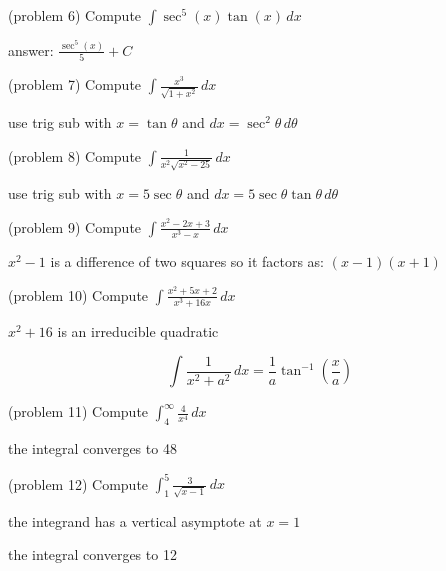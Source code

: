 \documentclass[handout]{ximera}
\begin{document}
\begin{problem}(problem 6)
Compute $\displaystyle \int \sec^5(x) \tan(x)  \, dx$

\begin{hint}
answer: $\displaystyle \frac{\sec^5(x)}{5} + C$
\end{hint}

\end{problem}


\begin{problem}(problem 7)
Compute $\displaystyle \int \frac{x^3}{ \sqrt{1+x^2}} \, dx$

\begin{hint}
use trig sub with $x = \tan \theta$ and $dx =  \sec^2 \theta \, d\theta$
\end{hint}

\end{problem}


\begin{problem}(problem 8)
Compute $\displaystyle \int \frac{1}{x^2 \sqrt{x^2 - 25}} \, dx$

\begin{hint}
use trig sub with $x = 5\sec \theta$ and $dx = 5 \sec \theta \tan \theta \, d\theta$
\end{hint}

\end{problem}


\begin{problem}(problem 9)
Compute $\displaystyle \int \frac{x^2 - 2x+3}{x^3-x} \, dx$

\begin{hint}
$x^2 - 1$ is a difference of two squares so it factors as: $(x-1)(x+1)$
\end{hint}

\end{problem}


\begin{problem}(problem 10)
Compute $\displaystyle \int \frac{x^2 + 5x + 2}{x^3 + 16x} \, dx$

\begin{hint}
$x^2 + 16$ is an irreducible quadratic
\end{hint}

\begin{hint}
\[
\int \frac{1}{x^2 + a^2} \, dx = \frac{1}{a} \tan^{-1}\left(\frac{x}{a}\right)
\]
\end{hint}

\end{problem}


\begin{problem}(problem 11)
Compute $\displaystyle \int_4^\infty \frac{4}{x^4} \, dx$

\begin{hint}
the integral converges to 48
\end{hint}

\end{problem}


\begin{problem}(problem 12)
Compute $\displaystyle \int_1^5 \frac{3}{\sqrt{x-1}} \, dx$

\begin{hint}
the integrand has a vertical asymptote at $x = 1$
\end{hint}

\begin{hint}
the integral converges to 12
\end{hint}


\end{problem}
\end{document}
